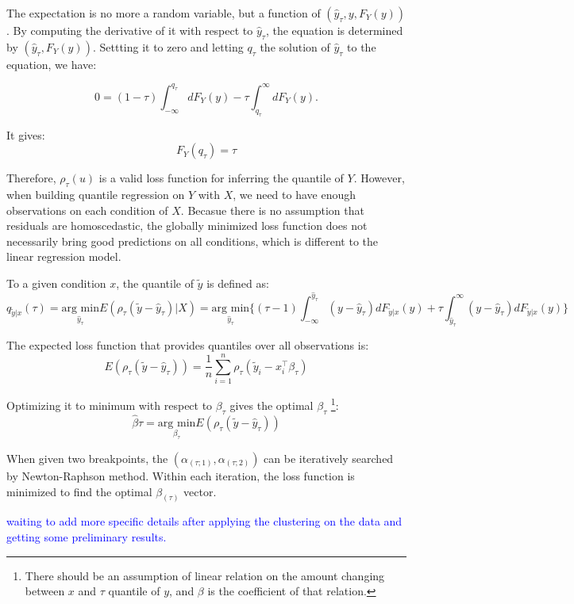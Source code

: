 The expectation is no more a random variable, but a function of $(\hat y_{\tau}, y, F_Y(y))$.
By computing the derivative of it with respect to $\hat y_{\tau}$, the equation is determined by $(\hat y_{\tau}, F_Y(y))$.
Settting it to zero and letting $q_{\tau}$ the solution of $\hat y_{\tau}$ to the equation, we have:

\[
    {\displaystyle 0=(1-\tau )\int _{-\infty }^{q_{\tau }}dF_{Y}(y)-\tau \int _{q_{\tau }}^{\infty }dF_{Y}(y).} 
\]

It gives:
\[
F_Y(q_{\tau}) = \tau
\]

Therefore, $\rho_\tau(u)$ is a valid loss function for inferring the quantile of $Y$.
However, when building quantile regression on $Y$ with $X$, we need to have enough observations on each condition of $X$.
Becasue there is no assumption that residuals are homoscedastic, the globally minimized loss function does not necessarily 
bring good predictions on all conditions, which is different to the linear regression model.

To a given condition $x$, the quantile of $\tilde y$ is defined as:
\[
    {\displaystyle q_{\tilde y|x}(\tau )={\underset {\hat y_{\tau}}{\mbox{arg min}}}E(\rho _{\tau }(\tilde y - \hat y_{\tau})|X)={\underset {\hat y_{\tau}}{\mbox{arg min}}}{\biggl \{}(\tau -1)\int _{-\infty }^{\hat y_{\tau}}(y - \hat y_{\tau})dF_{\tilde y|x}(y)+\tau \int _{\hat y_{\tau}}^{\infty }(y-\hat y_{\tau})dF_{\tilde y|x}(y){\biggr \}}} 
\]

The expected loss function that provides quantiles over all observations is:
\[
    E(\rho_{\tau}(\tilde y - \hat y_{\tau})) = \frac{1}{n} \sum_{i=1}^n \rho_\tau(\tilde y_i - x_i^\top \beta_{\tau})
\]

Optimizing it to minimum with respect to $\beta_{\tau}$ gives the optimal $\beta_{\tau}$
\footnote{There should be an assumption of linear relation on the amount changing between $x$ and $\tau$ quantile of $y$, and $\beta$ is the coefficient of that relation.}:
\[
\hat{\beta}\tau = {\underset {\beta_{\tau}}{\mbox{arg min}}} E(\rho_{\tau}(\tilde y - \hat y_{\tau}))
\]



When given two breakpoints, the $(\alpha_{(\tau; 1)}, \alpha_{(\tau; 2)})$ can be iteratively searched by 
Newton-Raphson method. Within each iteration, the loss function is minimized to find the optimal $\beta_{(\tau)}$ vector.

\textcolor{blue}{waiting to add more specific details after applying the clustering on the data and getting
some preliminary results.}



